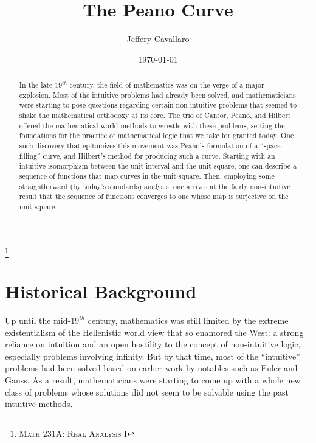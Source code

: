 \documentclass[letterpaper,12pt,fleqn,reqno]{amsart}
\theoremstyle{plain}
\begin{document}
\title{The Peano Curve}

\author{Jeffery Cavallaro}

\address{Department of Mathematics, San Jos\'e State University, San
  Jos\'e, CA 95192-0103}


\thanks{\textsc{Math 231A: Real Analysis I}}

\date{\today}

\begin{abstract}
In the late $19^{th}$ century, the field of mathematics was on the verge of a
major explosion. Most of the intuitive problems had already been solved, and
mathematicians were starting to pose questions regarding certain non-intuitive
problems that seemed to shake the mathematical orthodoxy at its core. The trio
of Cantor, Peano, and Hilbert offered the mathematical world methods to wrestle
with these problems, setting the foundations for the practice of mathematical
logic that we take for granted today. One such discovery that epitomizes this
movement was Peano's formulation of a ``space-filling'' curve, and Hilbert's
method for producing such a curve.  Starting with an intuitive isomorphism
between the unit interval and the unit square, one can describe a sequence of
functions that map curves in the unit square. Then, employing some
straightforward (by today's standards) analysis, one arrives at the fairly
non-intuitive result that the sequence of functions converges to one whose map
is surjective on the unit square.
\end{abstract}

\maketitle

\section{Historical Background}

Up until the mid-$19^{th}$ century, mathematics was still limited by the
extreme existentialism of the Hellenistic world view that so enamored the West:
a strong reliance on intuition and an open hostility to the concept of
non-intuitive logic, especially problems involving infinity. But by that time,
most of the ``intuitive'' problems had been solved based on earlier work by
notables such as Euler and Gauss. As a result, mathematicians were starting to
come up with a whole new class of problems whose solutions did not seem to be
solvable using the past intuitive methods.
\end{document}
